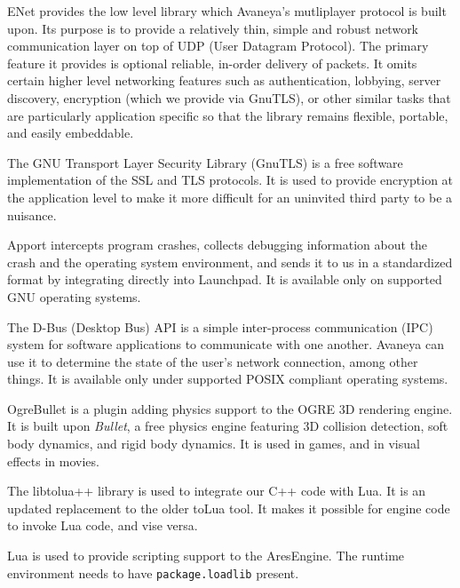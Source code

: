
\startitemize[3]
\setupwhitespace[big]

ENet provides the low level library which Avaneya's mutliplayer protocol is built upon. Its purpose is to provide a relatively thin, simple and robust network communication layer on top of UDP (User Datagram Protocol). The primary feature it provides is optional reliable, in-order delivery of packets. It omits certain higher level networking features such as authentication, lobbying, server discovery, encryption (which we provide via GnuTLS), or other similar tasks that are particularly application specific so that the library remains flexible, portable, and easily embeddable.


The GNU Transport Layer Security Library (GnuTLS) is a free software implementation of the SSL and TLS protocols. It is used to provide encryption at the application level to make it more difficult for an uninvited third party to be a nuisance.
\stopitemize


\startitemize[3]
\setupwhitespace[big]

Apport intercepts program crashes, collects debugging information about the crash and the operating system environment, and sends it to us in a standardized format by integrating directly into Launchpad. It is available only on supported GNU operating systems.


The D-Bus (Desktop Bus) API is a simple inter-process communication (IPC) system for software applications to communicate with one another. Avaneya can use it to determine the state of the user's network connection, among other things. It is available only under supported POSIX compliant operating systems.
\stopitemize


\startitemize[3]
\setupwhitespace[big]

OgreBullet is a plugin adding physics support to the OGRE 3D rendering engine. It is built upon {\it Bullet}, a free physics engine featuring 3D collision detection, soft body dynamics, and rigid body dynamics. It is used in games, and in visual effects in movies.
\stopitemize



\startitemize[3]
\setupwhitespace[big]

The libtolua++ library is used to integrate our C++ code with Lua. It is an updated replacement to the older toLua tool. It makes it possible for engine code to invoke Lua code, and vise versa.


Lua is used to provide scripting support to the AresEngine. The runtime environment needs to have {\tt package.loadlib} present.
\stopitemize

\StopChapter

